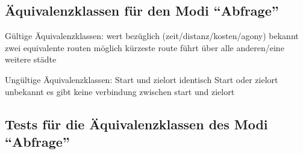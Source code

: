 \documentclass[a4paper]{report}
\begin{document}
\subsection*{Äquivalenzklassen für den Modi ``Abfrage''}
Gültige Äquivalenzklassen:
wert bezüglich (zeit/distanz/kosten/agony) bekannt
zwei equivalente routen möglich
kürzeste route führt über alle anderen/eine weitere städte

Ungültige Äquivalenzklassen:
Start und zielort identisch
Start oder zielort unbekannt
es gibt keine verbindung zwischen start und zielort

\subsection*{Tests für die Äquivalenzklassen des Modi ``Abfrage''}

\end{document}
